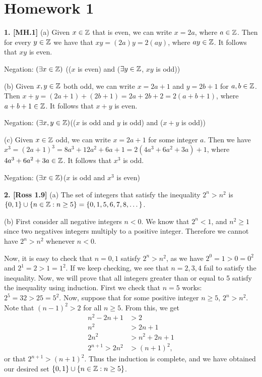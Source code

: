 \section{Homework 1}

\textbf{1. [MH.1]} (a) Given $x \in \mathbb{Z}$ that is even, we can write $x = 2a$, where $a \in \mathbb{Z}$. Then for every $y \in \mathbb{Z}$ we have that $xy = (2a)y = 2(ay)$, where $ay \in \mathbb{Z}$. It follows that $xy$ is even.

Negation: $(\exists x \in \mathbb{Z})$ (($x$ is even) and ($\exists y \in \mathbb{Z}$, $xy$ is odd))

(b) Given $x, y \in \mathbb{Z}$ both odd, we can write $x = 2a + 1$ and $y = 2b + 1$ for $a, b \in \mathbb{Z}$. Then $x + y = (2a + 1) + (2b + 1) = 2a + 2b + 2 = 2(a + b + 1)$, where $a + b + 1 \in \mathbb{Z}$. It follows that $x + y$ is even.

Negation: $(\exists x, y \in \mathbb{Z})$(($x$ is odd and $y$ is odd) and ($x + y$ is odd))

(c) Given $x \in \mathbb{Z}$ odd, we can write $x = 2a + 1$ for some integer $a$. Then we have $x^3 = (2a + 1)^3 = 8a^3 + 12a^2 + 6a + 1 = 2(4a^3 + 6a^2 + 3a) + 1$, where $4a^3 + 6a^2 + 3a \in \mathbb{Z}$. It follows that $x^3$ is odd.

Negation: $(\exists x \in \mathbb{Z})$($x$ is odd and $x^3$ is even)

\textbf{2. [Ross 1.9]} (a) The set of integers that satisfy the inequality $2^n > n^2$ is $\{0, 1\} \cup \{n \in \mathbb{Z} : n \geq 5\} = \{0, 1, 5, 6, 7, 8, \dots\}$.

(b) First consider all negative integers $n < 0$. We know that $2^n < 1$, and $n^2 \geq 1$ since two negatives integers multiply to a positive integer. Therefore we cannot have $2^n > n^2$ whenever $n < 0$.

Now, it is easy to check that $n = 0, 1$ satisfy $2^n > n^2$, as we have $2^0 = 1 > 0 = 0^2$ and $2^1 = 2 > 1 = 1^2$. If we keep checking, we see that $n = 2, 3, 4$ fail to satisfy the inequality. Now, we will prove that all integers greater than or equal to 5 satisfy the inequality using induction. First we check that $n = 5$ works: $2^5 = 32 > 25 = 5^2$. Now, suppose that for some positive integer $n \geq 5$, $2^n > n^2$. Note that $(n - 1)^2 > 2$ for all $n \geq 5$. From this, we get
\begin{align*}
    n^2 - 2n + 1 &> 2 \\
    n^2 &> 2n + 1 \\
    2n^2 &> n^2 + 2n + 1 \\
    2^{n + 1} > 2n^2 &> (n + 1)^2,
\end{align*}
or that $2^{n + 1} > (n + 1)^2$. Thus the induction is complete, and we have obtained our desired set $\{0, 1\} \cup \{n \in \mathbb{Z} : n \geq 5\}$.

